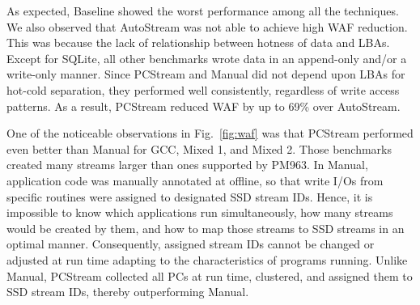 As expected, \textsf{\small Baseline} showed the worst performance among all the
techniques.  We also observed that \textsf{\small AutoStream} was not able to achieve high WAF
reduction.  This was because the lack of relationship between hotness of data
and LBAs. Except for SQLite, all other benchmarks wrote data in an append-only
and/or a write-only manner. Since \textsf{\small PCStream} and \textsf{\small Manual} did not
depend upon LBAs for hot-cold separation, they performed well consistently,
regardless of write access patterns.
As a result, \textsf{\small PCStream} reduced WAF by up to 69\% over 
\textsf{\small AutoStream}.



One of the noticeable observations in Fig.~\ref{fig:waf} was that PCStream
performed even better than Manual for GCC, Mixed 1, and Mixed 2.  Those
benchmarks created many streams larger than ones supported by PM963.  In
\textsf{Manual}, application code was manually annotated at offline, so that
write I/Os from specific routines were assigned to designated SSD stream IDs.
Hence, it is impossible to know which applications run simultaneously, how many
streams would be created by them, and how to map those streams to SSD streams
in an optimal manner. Consequently, assigned stream IDs cannot be changed or
adjusted at run time adapting to the characteristics of programs running.
Unlike \textsf{Manual}, \textsf{PCStream} collected all PCs at run time,
clustered, and assigned them to SSD stream IDs, thereby outperforming
\textsf{Manual}.



